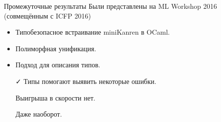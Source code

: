 \documentclass[10pt, mathserif]{beamer}
\theoremstyle{definition}
\begin{document}
\begin{frame}[fragile]{Промежуточные результаты}
Были представлены на ML Workshop 2016 (совмещённым с ICFP 2016)
\begin{itemize}
\item Типобезопасное встраивание miniKanren в OCaml.
\item Полиморфная унификация.
\item Подход для описания типов.
\end{itemize}

\vspace{2em}
\begin{enumerate}
 \item[\faCheck] Типы помогают выявить некоторые ошибки.
 \pause
 \item[\faTimes] Выигрыша в скорости нет.
 \item[\faTimes] Даже наоборот.
\end{enumerate}

\end{frame}



%
%
%
%
%
\end{document}
